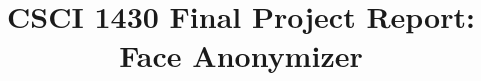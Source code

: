 
 \documentclass[10pt,twocolumn,letterpaper]{article}

\usepackage{cvpr}
\usepackage{times}
\usepackage{epsfig}
\usepackage{graphicx}
\usepackage{amsmath}
\usepackage{amssymb}
\usepackage{booktabs}
\usepackage{microtype}
\usepackage[numbered,framed]{matlab-prettifier}

\frenchspacing


\usepackage[pagebackref=true,breaklinks=true,letterpaper=true,colorlinks,bookmarks=false]{hyperref}

\cvprfinalcopy
\def\cvprPaperID{****}
\def\httilde{\mbox{\tt\raisebox{-.5ex}{\symbol{126}}}}
\ifcvprfinal\pagestyle{empty}\fi



\title{CSCI 1430 Final Project Report:\\Face Anonymizer}


